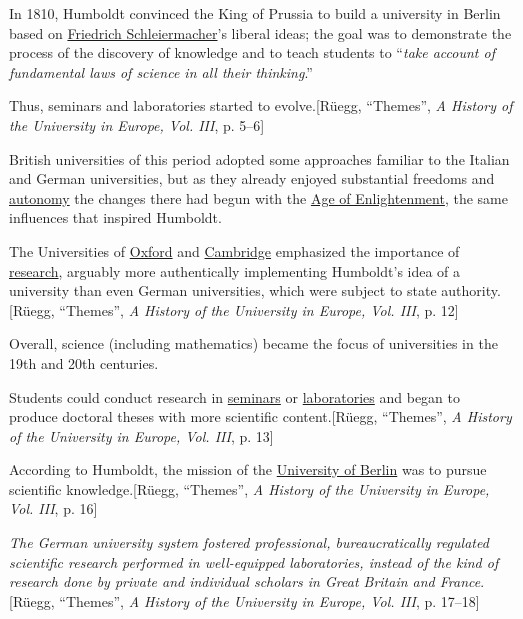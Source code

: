 \documentclass{article}
\begin{document}
In 1810, Humboldt convinced the King of Prussia to build a university in Berlin based on \href{https://en.wikipedia.org/wiki/Friedrich_Schleiermacher}{Friedrich Schleiermacher}'s liberal ideas; the goal was to demonstrate the process of the discovery of knowledge and to teach students to ``\textit{take account of fundamental laws of science in all their thinking}.''

Thus, seminars and laboratories started to evolve.[Rüegg, ``Themes'', \textit{A History of the University in Europe, Vol. III}, p. 5--6]

%
British universities of this period adopted some approaches familiar to the Italian and German universities, but as they already enjoyed substantial freedoms and \href{https://en.wikipedia.org/wiki/Autonomy}{autonomy} the changes there had begun with the \href{https://en.wikipedia.org/wiki/Age_of_Enlightenment}{Age of Enlightenment}, the same influences that inspired Humboldt.

The Universities of \href{https://en.wikipedia.org/wiki/University_of_Oxford}{Oxford} and \href{https://en.wikipedia.org/wiki/University_of_Cambridge}{Cambridge} emphasized the importance of \href{https://en.wikipedia.org/wiki/Research}{research}, arguably more authentically implementing Humboldt's idea of a university than even German universities, which were subject to state authority.[Rüegg, ``Themes'', \textit{A History of the University in Europe, Vol. III}, p. 12]

Overall, science (including mathematics) became the focus of universities in the 19th and 20th centuries.

Students could conduct research in \href{https://en.wikipedia.org/wiki/Seminars}{seminars} or \href{https://en.wikipedia.org/wiki/Laboratories}{laboratories} and began to produce doctoral theses with more scientific content.[Rüegg, ``Themes'', \textit{A History of the University in Europe, Vol. III}, p. 13]

According to Humboldt, the mission of the \href{https://en.wikipedia.org/wiki/University_of_Berlin}{University of Berlin} was to pursue scientific knowledge.[Rüegg, ``Themes'', \textit{A History of the University in Europe, Vol. III}, p. 16]

\textit{The German university system fostered professional, bureaucratically regulated scientific research performed in well-equipped laboratories, instead of the kind of research done by private and individual scholars in Great Britain and France}.[Rüegg, ``Themes'', \textit{A History of the University in Europe, Vol. III}, p. 17--18]
\end{document}
